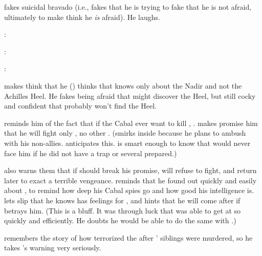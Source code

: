 \Ishnaruchaefir{} fakes suicidal bravado (i.e., fakes that he is trying to fake that he is not afraid, ultimately to make \Teshrial{} think he \emph{is} afraid).
He laughs.

\begin{prose}
  \Ishnaruchaefir: 
  
  \Teshrial:
  
  \Ishnaruchaefir:
\end{prose}

\Ishnaruchaefir{} makes \Teshrial{} think that he (\Ishnaruchaefir) thinks that \Teshrial{} knows only about the Nadir and not the Achilles Heel. 
He fakes being afraid that \Teshrial{} might discover the Heel, but still cocky and confident that \Teshrial{} probably won't find the Heel. 

\Ishnaruchaefir reminds him of the fact that if the Cabal ever want to kill \Ishnaruchaefir, . 
\Ishnaruchaefir makes \Teshrial promise him that he will fight only \Teshrial, no other \resphain. 
(\Teshrial smirks inside because he plans to ambush \Ishnaruchaefir with his non-\resphan allies. \Ishnaruchaefir anticipates this. \Ishnaruchaefir is smart enough to know that \Teshrial would never face him if he did not have a trap or several prepared.)

\Ishnaruchaefir also warns them that if \Teshrial should break his promise, \Ishnaruchaefir will refuse to fight, and return later to exact a terrible vengeance.
\Ishnaruchaefir reminds \Teshrial that he found out quickly and easily about \Urizeth, to remind \Teshrial how deep his Cabal spies go and how good his intelligence is.
\Ishnaruchaefir lets slip that he knows \Teshrial has feelings for \Firaxel, and hints that he will come after \Firaxel if \Teshrial betrays him. 
(This is a bluff. It was through luck that \Ishnaruchaefir was able to get at \Urizeth so quickly and efficiently. He doubts he would be able to do the same with \Firaxel.)

\Teshrial remembers the story of how \Ishnaruchaefir terrorized the \resphain after \Criseis' siblings were murdered, so he takes \Ishnaruchaefir's warning very seriously.
















